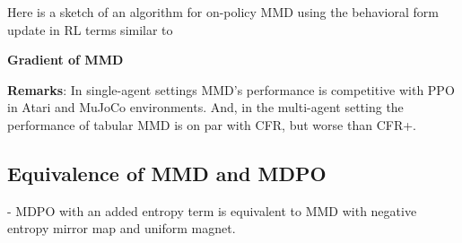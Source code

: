 Here is a sketch of an algorithm for on-policy MMD using the behavioral form update in RL terms
similar to

\begin{alprocedure}
	\label{alg:mmdbf}

\end{alprocedure}

\textbf{Gradient of MMD}

\textbf{Remarks}: In single-agent settings MMD's performance is competitive
with PPO in Atari and MuJoCo environments.
And, in the multi-agent setting the performance of tabular MMD is on par with CFR, but worse than
CFR+.

\subsection{Equivalence of MMD and MDPO}

- MDPO with an added entropy term is equivalent to MMD with negative entropy mirror map and
uniform magnet.